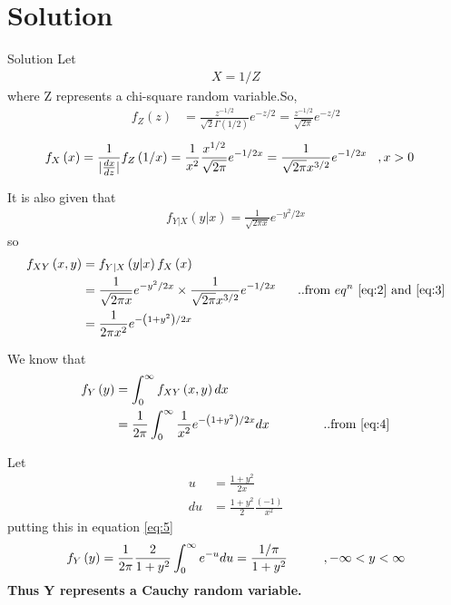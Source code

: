 \documentclass[journal,12pt,twocolumn]{beamer}
\providecommand{\brak}[1]{\ensuremath{\left(#1\right)}}
\begin{document}
\section{Solution}
\begin{frame}{Solution}
Let
\begin{align}
    X=1/Z \nonumber
\end{align}
where Z represents a chi-square random variable.So,
\begin{align}
    f_Z\brak{z}&=\frac{z^{-1/2}}{\sqrt{2}\Gamma{\brak{1/2}}}e^{-z/2} 
    =\frac{z^{-1/2}}{\sqrt{2\pi}}e^{-z/2}
\end{align}
\begin{align}
\label{eq:2}
    f_X\brak{x}&=\frac{1}{\lvert \frac{dx}{dz}\rvert} f_Z\brak{1/x}
    =\frac{1}{x^2}\frac{x^{1/2}}{\sqrt{2\pi}}e^{-1/2x}
    =\frac{1}{\sqrt{2\pi}x^{3/2}}e^{-1/2x}\hspace{3mm},\text{$x>0$}
\end{align}
\end{frame}
\begin{frame}
It is also given that
\begin{align}
\label{eq:3}
    f_{Y|X}\brak{y|x}=\frac{1}{\sqrt{2\pi x}}e^{-y^2/2x}
\end{align}
so
    \begin{align}
    \label{eq:4}
        f_{XY}\brak{x,y}&=f_{Y|X}\brak{y|x}f_X\brak{x}\nonumber\\
      &=\frac{1}{\sqrt{2\pi x}}e^{-y^2/2x}\times \frac{1}{\sqrt{2\pi}x^{3/2}}e^{-1/2x} \hspace{6mm}\text{..from  $eq^n$ \eqref{eq:2} and \eqref{eq:3}}   \nonumber\\
      &=\frac{1}{2\pi x^2}e^{-\brak{1+y^2}/2x}
    \end{align}
\end{frame}
\begin{frame}
We know that
\begin{align}
    f_Y\brak{y}&=\int_0^\infty f_{XY}\brak{x,y}dx
    \nonumber\\
    \label{eq:5}
    &=\frac{1}{2\pi}\int_0^\infty \frac{1}{x^2}e^{-\brak{1+y^2}/2x}dx \hspace{15mm}\text{..from \eqref{eq:4}} 
    \end{align}
\end{frame}
\begin{frame}
    Let
    \begin{align}
        u&=\frac{1+y^2}{2x}    \nonumber\\
       du&=\frac{1+y^2}{2}\frac{\brak{-1}}{x^2}   \nonumber
    \end{align}
    putting this in equation \eqref{eq:5}
    \begin{align}
        f_Y\brak{y}=\frac{1}{2\pi}\frac{2}{1+y^2}\int_0^\infty e^{-u}du
        =\frac{1/\pi}{1+y^2}   \hspace{10mm} ,\text{$-\infty<y<\infty$}\nonumber
    \end{align}
    \textbf{Thus Y represents a Cauchy random variable.}
\end{frame}
\end{document}
